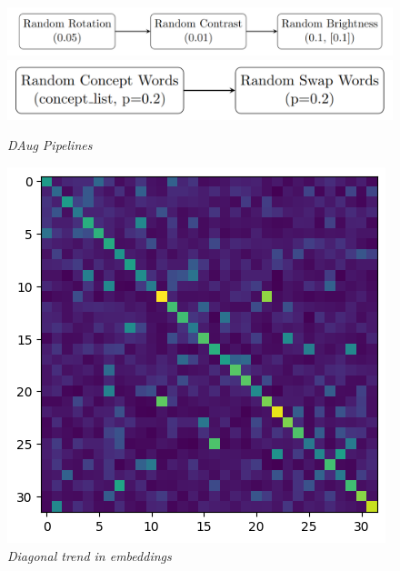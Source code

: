 \documentclass[10pt,twocolumn,letterpaper]{article}
\begin{document}
\begin{figure}[H]
   \centering
   \includegraphics[width=1\linewidth]{img/Tikz_Daug_1.png}
   \includegraphics[width=0.8\linewidth]{img/Tikz_Daug_2.png}
   \caption{\textit{DAug Pipelines}}
   \label{fig:daugp}
\end{figure}

\begin{figure}[H]
   \centering
   \includegraphics[width=0.6\linewidth]{img/Diagonal.png}
   \caption{\textit{Diagonal trend in embeddings}}
   \label{fig:diag}
\end{figure}


{\small


}
\end{document}
